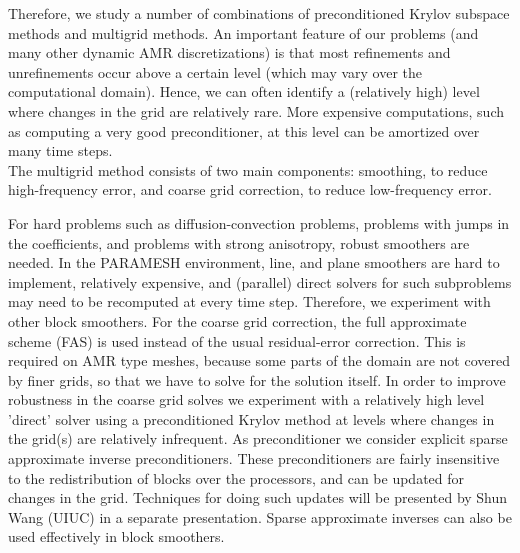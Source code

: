 \documentclass{report}
\begin{document}
Therefore, we study a number of combinations of
preconditioned Krylov subspace methods and multigrid methods. An important feature
of our problems (and many other dynamic AMR discretizations) is that most refinements
and unrefinements occur above a certain level (which may vary over the computational
domain). Hence, we can often identify a (relatively high) level where changes in the
grid are relatively rare. More expensive computations, such as computing a very good
preconditioner, at this level can be amortized over many time steps.\\

The multigrid method consists of two main components: smoothing,
to reduce high-frequency error, and coarse
grid correction, to reduce low-frequency error.

For hard problems such as diffusion-convection problems, problems with
jumps in the coefficients, and problems with strong anisotropy,
robust smoothers are needed. In the PARAMESH environment, line, and plane
smoothers are hard to implement, relatively expensive, and (parallel)
direct solvers
for such subproblems may need to be recomputed at every time step.
Therefore, we experiment with other block smoothers.
For the coarse grid correction, the full approximate scheme (FAS) is used
instead of the usual residual-error correction. This is required
on AMR type meshes, because some parts of the domain are not
covered by finer grids, so that we have to solve for the solution
itself. In order to improve robustness in the coarse grid solves
we experiment with a relatively high level 'direct' solver using a
preconditioned Krylov method at levels where changes in the grid(s) are
relatively infrequent. As preconditioner we consider explicit
sparse approximate inverse preconditioners. These preconditioners are fairly
insensitive to the redistribution of blocks over the processors, and can
be updated for changes in the grid. Techniques for doing such updates will be
presented by Shun Wang (UIUC) in a separate presentation. Sparse approximate
inverses can also be used effectively in block smoothers.\\
\end{document}
